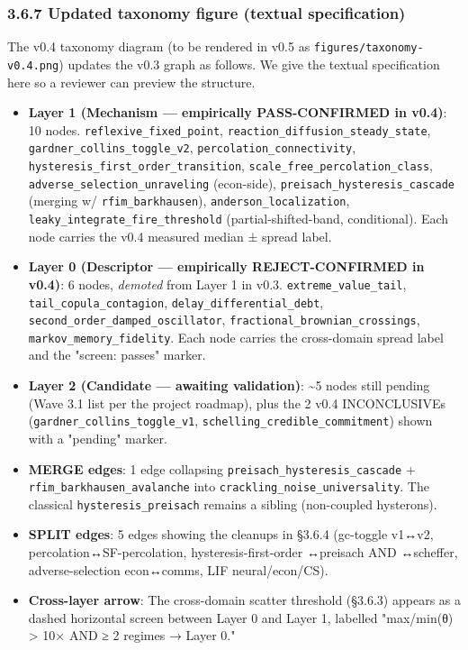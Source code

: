 \documentclass[
  11pt]{article}
\providecommand{\tightlist}{%
  \setlength{\itemsep}{0pt}\setlength{\parskip}{0pt}}
\begin{document}
\subsubsection{3.6.7 Updated taxonomy figure (textual
specification)}\label{367-updated-taxonomy-figure-textual}

The v0.4 taxonomy diagram (to be rendered in v0.5 as
\texttt{figures/taxonomy-v0.4.png}) updates the v0.3 graph as follows.
We give the textual specification here so a reviewer can preview the
structure.

\begin{itemize}
\tightlist
\item
  \textbf{Layer 1 (Mechanism --- empirically PASS-CONFIRMED in v0.4)}:
  10 nodes. \texttt{reflexive\_fixed\_point},
  \texttt{reaction\_diffusion\_steady\_state},
  \texttt{gardner\_collins\_toggle\_v2},
  \texttt{percolation\_connectivity},
  \texttt{hysteresis\_first\_order\_transition},
  \texttt{scale\_free\_percolation\_class},
  \texttt{adverse\_selection\_unraveling} (econ-side),
  \texttt{preisach\_hysteresis\_cascade} (merging w/
  \texttt{rfim\_barkhausen}), \texttt{anderson\_localization},
  \texttt{leaky\_integrate\_fire\_threshold} (partial-shifted-band,
  conditional). Each node carries the v0.4 measured median ± spread
  label.
\item
  \textbf{Layer 0 (Descriptor --- empirically REJECT-CONFIRMED in v0.4)}:
  6 nodes, \emph{demoted} from Layer 1 in v0.3.
  \texttt{extreme\_value\_tail}, \texttt{tail\_copula\_contagion},
  \texttt{delay\_differential\_debt},
  \texttt{second\_order\_damped\_oscillator},
  \texttt{fractional\_brownian\_crossings},
  \texttt{markov\_memory\_fidelity}. Each node carries the cross-domain
  spread label and the "screen: passes" marker.
\item
  \textbf{Layer 2 (Candidate --- awaiting validation)}:
  \textasciitilde 5 nodes still pending (Wave 3.1 list per the project
  roadmap), plus the 2 v0.4 INCONCLUSIVEs
  (\texttt{gardner\_collins\_toggle\_v1},
  \texttt{schelling\_credible\_commitment}) shown with a "pending"
  marker.
\item
  \textbf{MERGE edges}: 1 edge collapsing
  \texttt{preisach\_hysteresis\_cascade} +
  \texttt{rfim\_barkhausen\_avalanche} into
  \texttt{crackling\_noise\_universality}. The classical
  \texttt{hysteresis\_preisach} remains a sibling (non-coupled
  hysterons).
\item
  \textbf{SPLIT edges}: 5 edges showing the cleanups in §3.6.4
  (gc-toggle v1↔v2, percolation↔SF-percolation, hysteresis-first-order
  ↔preisach AND ↔scheffer, adverse-selection econ↔comms, LIF
  neural/econ/CS).
\item
  \textbf{Cross-layer arrow}: The cross-domain scatter threshold
  (§3.6.3) appears as a dashed horizontal screen between Layer 0 and
  Layer 1, labelled "max/min(θ) > 10× AND ≥ 2 regimes → Layer 0."
\end{itemize}
\end{document}
